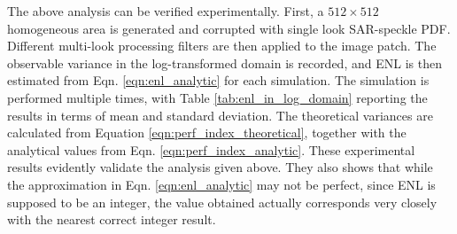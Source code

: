 \documentclass[journal]{IEEEtran}
\begin{document}
The above analysis can be verified experimentally. First, a $512\times512$ homogeneous area is generated and 
corrupted with single look SAR-speckle PDF. 
Different multi-look processing filters are then applied to the image patch. 
The observable variance in the log-transformed domain is recorded, and 
	 ENL is then estimated from Eqn. \ref{eqn:enl_analytic} for each simulation.
The simulation is performed multiple times, with Table \ref{tab:enl_in_log_domain} reporting the results in terms 
of mean and standard deviation.
The theoretical variances are calculated from Equation \ref{eqn:perf_index_theoretical}, 
	together with the analytical values from Eqn. \ref{eqn:perf_index_analytic}.
These experimental results evidently validate the analysis given above.
They also shows that 
	while the approximation in Eqn. \ref{eqn:enl_analytic} may not be perfect, 
	since ENL is supposed to be an integer, the value obtained actually corresponds very closely with the 
	nearest correct integer result.
\end{document}
